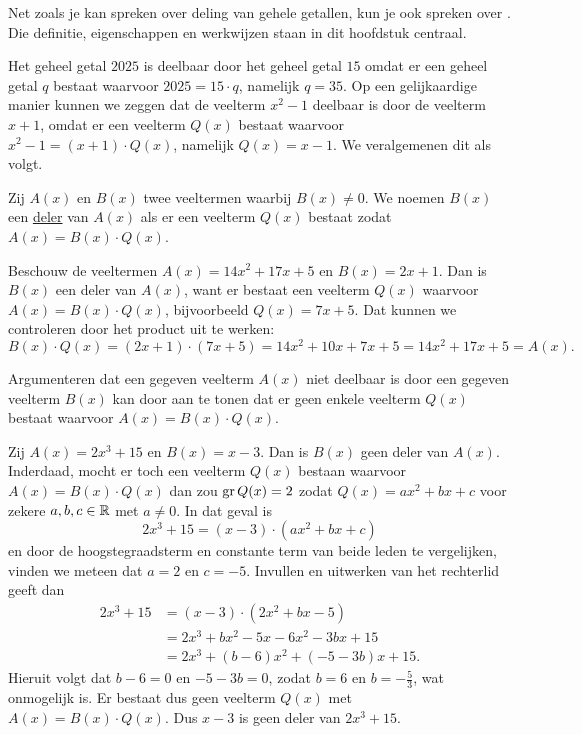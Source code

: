 \documentclass{ximera}
\begin{document}
	\author{Koen De Naeghel}
	\label{xim:veeltermen_deelbaarheid}

Net zoals je kan spreken over deling van gehele getallen, kun je ook spreken over . Die definitie, eigenschappen en werkwijzen staan in dit hoofdstuk centraal. 

Het geheel getal $2025$ is deelbaar door het geheel getal $15$ omdat er een geheel getal $q$ bestaat waarvoor $2025 = 15\cdot q$, namelijk $q = 35$. Op een gelijkaardige manier kunnen we zeggen dat de veelterm $x^2-1$ deelbaar is door de veelterm $x+1$, omdat er een veelterm $Q(x)$ bestaat waarvoor $x^2-1 = (x+1)\cdot Q(x)$, namelijk $Q(x) = x-1$. We veralgemenen dit als volgt.

\begin{definition}[in woorden]\label{definitie:deler}
Zij $A(x)$ en $B(x)$ twee veeltermen waarbij $B(x) \neq 0$. 
We noemen $B(x)$ een \underline{deler} van $A(x)$ als er een veelterm $Q(x)$ bestaat zodat $A(x) = B(x)\cdot Q(x)$.
\end{definition}

\begin{example}
Beschouw de veeltermen $A(x) = 14x^2+17x+5$ en $B(x) = 2x+1$. Dan is $B(x)$ een deler van $A(x)$, want er bestaat een veelterm $Q(x)$ waarvoor $A(x) = B(x) \cdot Q(x)$, bijvoorbeeld $Q(x) = 7x+5$. Dat kunnen we controleren door het product %
uit te werken:
\[
B(x) \cdot Q(x) = (2x+1) \cdot (7x+5) = 14x^2 + 10x + 7x + 5 = 14x^2 + 17x + 5 = A(x).
\]
\end{example}

Argumenteren dat een gegeven veelterm $A(x)$ niet deelbaar is door een gegeven veelterm $B(x)$ kan door aan te tonen dat er geen enkele veelterm $Q(x)$ bestaat waarvoor $A(x) = B(x) \cdot Q(x)$. 

\begin{example} \label{geendeler}
Zij $A(x) = 2x^3+15$ en $B(x) = x-3$. Dan is $B(x)$ geen deler van $A(x)$. Inderdaad, mocht er toch een veelterm $Q(x)$ bestaan waarvoor $A(x) = B(x) \cdot Q(x)$ dan zou $\operatorname{gr} Q(x) = 2$ zodat $Q(x) = a x^2 + b x + c$ voor zekere $a,b,c \in \mathbb{R}$ met $a \neq 0$. In dat geval is
\[
2x^3+15 = (x-3) \cdot (a x^2 + b x + c) 
\]
en door de hoogstegraadsterm en constante term van beide leden te vergelijken, vinden we meteen dat $a = 2$ en $c = -5$. Invullen en uitwerken van het rechterlid geeft dan
\begin{align*}
2x^3+15 
& = (x-3) \cdot (2 x^2 + b x - 5) \\
& = 2x^3 + bx^2 - 5x - 6x^2 - 3bx + 15 \\
& = 2x^3 + (b-6)x^2 + (-5-3b)x + 15.
\end{align*}
Hieruit volgt dat $b - 6 = 0$ en $-5-3b = 0$, zodat $b = 6$ en $b = -\frac{5}{3}$, wat onmogelijk is. Er bestaat dus geen veelterm $Q(x)$ met $A(x) = B(x) \cdot Q(x)$. Dus $x-3$ is geen deler van $2x^3+15$. 
\end{example}
\end{document}
